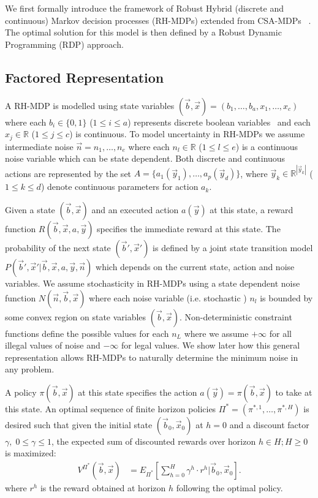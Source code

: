 We first formally introduce the framework of Robust Hybrid (discrete and continuous) Markov decision processes (RH-MDPs) extended from CSA-MDPs ~\cite{sdp_aaai}. The optimal solution for this model is then defined by a Robust Dynamic Programming (RDP) approach. 
\subsection{Factored Representation}

A RH-MDP is modelled using state variables $(\vec{b},\vec{x}) = ( b_1,\ldots,b_a,x_{1},\ldots,x_c )$ where each $b_i \in \{ 0,1 \}$ ($1 \leq i \leq a$) represents discrete boolean variables $\,$
and each $x_j \in \mathbb{R}$ ($1 \leq j \leq c$) is continuous.  To model uncertainty in RH-MDPs we assume intermediate noise $\vec{n} = n_1, \ldots , n_e$ where each $n_l \in \mathbb{R}$ ($1 \leq l \leq e$) is a continuous noise variable which can be state dependent.  Both discrete and continuous actions are represented by the set $A = \{a_1(\vec{y}_1), \ldots, a_p(\vec{y}_d) \}$, where  $\vec{y}_k \in \mathbb{R}^{|\vec{y}_k|}$ ($1\leq k \leq d$) denote continuous parameters for action $a_k$. 

Given a state $(\vec{b},\vec{x})$ and an executed action $a(\vec{y})$ at this state, a
reward function $R(\vec{b},\vec{x},a,\vec{y})$ specifies the immediate reward at this state. The probability of the next state $(\vec{b}',\vec{x}')$ is defined by a joint state transition model $P(\vec{b}',\vec{x}'| \vec{b},\vec{x},a,\vec{y},\vec{n})$ which depends on the current state, action and noise variables. We assume stochasticity in RH-MDPs using a state dependent noise function $N(\vec{n},\vec{b},\vec{x})$ where each noise variable (i.e. stochastic ) $n_l$ is bounded by some convex region on state variables $(\vec{b},\vec{x})$. Non-deterministic constraint functions define the possible values for each $n_L$ where we assume $+\infty$ for all illegal values of noise and $-\infty$ for legal values. We show later how this general representation allows RH-MDPs to naturally determine the minimum noise in any problem. 

A policy $\pi(\vec{b},\vec{x})$ at this state specifies the action $a(\vec{y}) =
\pi(\vec{b},\vec{x})$ to take at this state.  An optimal sequence of finite horizon policies $\Pi^* = (\pi^{*,1},\ldots,\pi^{*,H})$ is desired such that given the initial state $(\vec{b}_0,\vec{x}_0)$ at $h=0$ and  a discount factor $\gamma, \; 0 \leq \gamma \leq 1$, the expected sum of discounted rewards over horizon $h \in H ;H \geq 0$ is maximized: 
\begin{align}
V^{\Pi^*}(\vec{b},\vec{x}) & = E_{\Pi^*} \left[ \sum_{h=0}^{H} \gamma^h \cdot r^h \Big| \vec{b}_0,\vec{x}_0\right].
\end{align}
where $r^h$ is the reward obtained at horizon $h$ following the optimal policy. 

